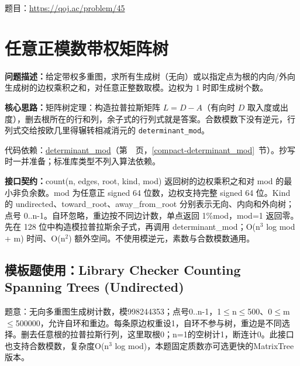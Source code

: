 题目：\url{https://qoj.ac/problem/45}



\Needspace{546pt}

\section{任意正模数带权矩阵树}\label{compact-MatrixTreeMod}

\noindent\textbf{问题描述：}\allowbreak 给定带权多重图，求所有生成树（无向）或以指定点为根的内向/外向生成树的边权乘积之和，对任意正整数取模。边权为 1 时即生成树个数。

\textbf{核心思路：}\allowbreak 矩阵树定理：构造拉普拉斯矩阵 $L=D-A$（有向时 $D$ 取入度或出度），删去根所在的行和列，余子式的行列式就是答案。合数模数下没有逆元，行列式交给按欧几里得辗转相减消元的 \texttt{determinant\_mod}。

代码依赖：\hyperref[compact-determinant_mod]{determinant\_\allowbreak{}mod}（第~\pageref{compact-determinant_mod}~页，\ref{compact-determinant_mod}~节）。抄写时一并准备；标准库类型不列入算法依赖。

{\sloppy{}\noindent\textbf{接口契约：}count(n, edges, root, kind, mod) 返回树的边权乘积之和对 mod 的最小非负余数。mod 为任意正 signed 64 位数，边权支持完整 signed 64 位。Kind 的 undirected、toward\_root、away\_from\_root 分别表示无向、内向和外向树；点号 0..n-1。自环忽略，重边按不同边计数，单点返回 1\%mod，mod=1 返回零。先在 128 位中构造模拉普拉斯余子式，再调用 determinant\_mod；O(n$^{3}$ log mod + m) 时间、O(n$^{2}$) 额外空间。不使用模逆元，素数与合数模数通用。\par}



\Needspace{383pt}

\subsection*{模板题使用：Library Checker Counting Spanning Trees (Undirected)}

\label{usage-example-187}

题意：无向多重图生成树计数，模998244353；点号0..n-1，1$\le$n$\le$500、0$\le$m$\le$500000，允许自环和重边。每条原边权重设1，自环不参与树，重边是不同选择。删去任意根的拉普拉斯行列，这里取根0；n=1的空树计1，断连计0。此接口也支持合数模数，复杂度O(n$^{3}$ log mod)，本题固定质数亦可选更快的MatrixTree版本。

